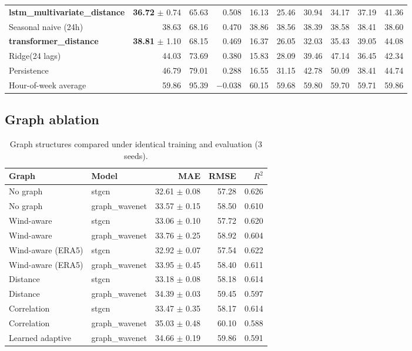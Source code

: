 \documentclass[11pt,a4paper]{article}
\begin{document}
\begin{table}[htbp]
{\begin{tabular}{lrrrrrrrrr}
\textbf{lstm\_multivariate\_distance}& \textbf{36.72} $\pm$ 0.74 & 65.63 & 0.508 & 16.13 & 25.46 & 30.94 & 34.17 & 37.19 & 41.36 \\
Seasonal naive (24h)               & 38.63 & 68.16 & 0.470 & 38.86 & 38.56 & 38.39 & 38.58 & 38.41 & 38.60 \\
\textbf{transformer\_distance}     & \textbf{38.81} $\pm$ 1.10 & 68.15 & 0.469 & 16.37 & 26.05 & 32.03 & 35.43 & 39.05 & 44.08 \\
Ridge(24 lags)                     & 44.03 & 73.69 & 0.380 & 15.83 & 28.09 & 39.46 & 47.14 & 36.45 & 42.34 \\
Persistence                        & 46.79 & 79.01 & 0.288 & 16.55 & 31.15 & 42.78 & 50.09 & 38.41 & 44.74 \\
Hour-of-week average               & 59.86 & 95.39 &$-$0.038 & 60.15 & 59.68 & 59.80 & 59.70 & 59.71 & 59.86 \\
\bottomrule
\end{tabular}%
}
\end{table}

\subsection{Graph ablation}

\begin{table}[htbp]
\centering
\caption{Graph structures compared under identical training and evaluation (3 seeds).}
\label{tab:ablation}
\begin{tabular}{llrrr}
\toprule
Graph & Model & MAE & RMSE & $R^2$ \\
\midrule
No graph     & stgcn         & 32.61 $\pm$ 0.08 & 57.28 & 0.626 \\
No graph     & graph\_wavenet& 33.57 $\pm$ 0.15 & 58.50 & 0.610 \\
Wind-aware   & stgcn         & 33.06 $\pm$ 0.10 & 57.72 & 0.620 \\
Wind-aware   & graph\_wavenet& 33.76 $\pm$ 0.25 & 58.92 & 0.604 \\
Wind-aware (ERA5) & stgcn    & 32.92 $\pm$ 0.07 & 57.54 & 0.622 \\
Wind-aware (ERA5) & graph\_wavenet & 33.95 $\pm$ 0.45 & 58.40 & 0.611 \\
Distance     & stgcn         & 33.18 $\pm$ 0.08 & 58.18 & 0.614 \\
Distance     & graph\_wavenet& 34.39 $\pm$ 0.03 & 59.45 & 0.597 \\
Correlation  & stgcn         & 33.47 $\pm$ 0.35 & 58.17 & 0.614 \\
Correlation  & graph\_wavenet& 35.03 $\pm$ 0.48 & 60.10 & 0.588 \\
Learned adaptive & graph\_wavenet & 34.66 $\pm$ 0.19 & 59.86 & 0.591 \\
\bottomrule
\end{tabular}
\end{table}
\end{document}
